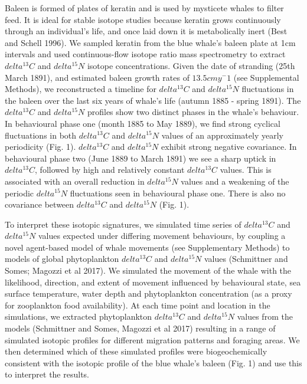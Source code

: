 \documentclass[a4paper,12pt]{article}
\begin{document}
Baleen is formed of plates of keratin and is used by mysticete whales to filter feed. 
It is ideal for stable isotope studies because keratin grows continuously through an individual's life, and once laid down it is metabolically inert (Best and Schell 1996). 
We sampled keratin from the blue whale’s baleen plate at 1cm intervals and used continuous-flow isotope ratio mass spectrometry to extract $delta^13C$ and $delta^15N$ isotope concentrations. 
Given the date of stranding (25th March 1891), and estimated baleen growth rates of $13.5 cm y^-1$ (see Supplemental Methods), we reconstructed a timeline for $delta^13C$ and $delta^15N$ fluctuations in the baleen over the last six years of whale’s life (autumn 1885 - spring 1891). The $delta^13C$ and $delta^15N$ profiles show two distinct phases in the whale's behaviour. 
In behavioural phase one (month 1885 to May 1889), we find strong cyclical fluctuations in both $delta^13C$ and $delta^15N$ values of an approximately yearly periodicity (Fig. 1). $delta^13C$ and $delta^15N$ exhibit strong negative covariance. 
In behavioural phase two (June 1889 to March 1891) we see a sharp uptick in $delta^13C$, followed by high and relatively constant $delta^13C$ values. 
This is associated with an overall reduction in $delta^15N$ values and a weakening of the periodic $delta^15N$ fluctuations seen in behavioural phase one. There is also no covariance between $delta^13C$ and $delta^15N$ (Fig. 1). 

 
To interpret these isotopic signatures, we simulated time series of $delta^13C$ and $delta^15N$ values expected under differing movement behaviours, by coupling a novel agent-based model of whale movements (see Supplementary Methods) to models of global phytoplankton $delta^13C$ and $delta^15N$ values (Schmittner and Somes; Magozzi et al 2017). 
We simulated the movement of the whale with the likelihood, direction, and extent of movement influenced by behavioural state, sea surface temperature, water depth and phytoplankton concentration (as a proxy for zooplankton food availability). 
At each time point and location in the simulations, we extracted phytoplankton $delta^13C$ and $delta^15N$ values from the models (Schmittner and Somes, Magozzi et al 2017) resulting in a range of simulated isotopic profiles for different migration patterns and foraging areas. 
We then determined which of these simulated profiles were biogeochemically consistent with the isotopic profile of the blue whale’s baleen (Fig. 1) and use this to interpret the results.
 
\end{document}
